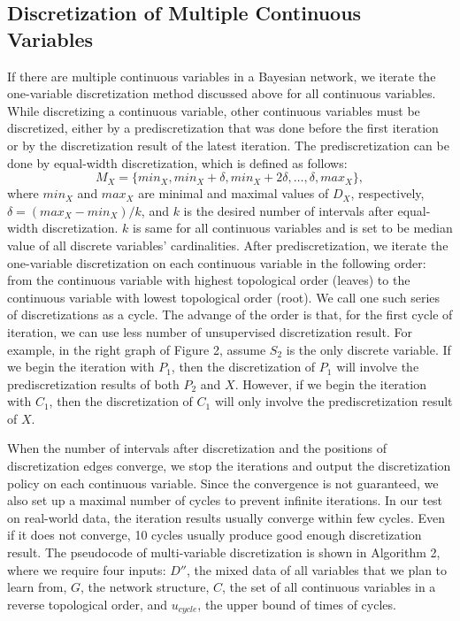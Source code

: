 \subsection{Discretization of Multiple Continuous Variables}
\label{DMC}
If there are multiple continuous variables in a Bayesian network, we iterate the one-variable discretization method discussed above for all continuous variables. While discretizing a continuous variable, other continuous variables must be discretized, either by a prediscretization that was done before the first iteration or by the discretization result of the latest iteration. The prediscretization can be done by equal-width discretization, which is defined as follows:
\begin{equation}
M_X =  \{ min_X, min_X + \delta, min_X + 2\delta, \ldots, \delta, max_X \},
\end{equation}
where $min_X$ and $max_X$ are minimal and maximal values of $D_X$, respectively, $\delta =  (max_X - min_X)/k$, and $k$ is the desired number of intervals after equal-width discretization. $k$ is same for all continuous variables and is set to be median value of all discrete variables' cardinalities. After prediscretization, we iterate the one-variable discretization on each continuous variable in the following order: from the continuous variable with highest topological order (leaves) to the continuous variable with lowest topological order (root). We call one such series of discretizations as a cycle. The advange of the order is that, for the first cycle of iteration, we can use less number of unsupervised discretization result. For example, in the right graph of Figure 2, assume $S_2$ is the only discrete variable. If we begin the iteration with $P_1$, then the discretization of $P_1$ will involve the prediscretization results of both $P_2$ and $X$. However, if we begin the iteration with $C_1$, then the discretization of $C_1$ will only involve the prediscretization result of $X$.

When the number of intervals after discretization and the positions of discretization edges converge, we stop the iterations and output the discretization policy on each continuous variable. Since the convergence is not guaranteed, we also set up a maximal number of cycles to prevent infinite iterations. In our test on real-world data, the iteration results usually converge within few cycles. Even if it does not converge, 10 cycles usually produce good enough discretization result. The pseudocode of multi-variable discretization is shown in Algorithm 2, where we require four inputs: $D''$, the mixed data of all variables that we plan to learn from, $G$, the network structure, $C$, the set of all continuous variables in a reverse topological order, and $u_{cycle}$, the upper bound of times of cycles.

